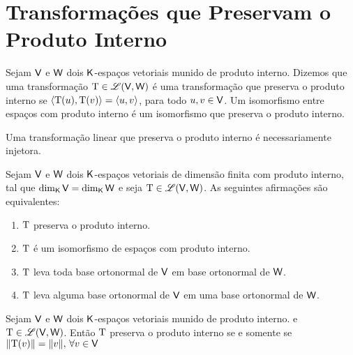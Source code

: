 \documentclass[10pt,a4paper]{book}
\begin{document}
\section{Transformações que Preservam o Produto Interno}

\begin{definition}
	Sejam $\mathsf{ V }$ e $\mathsf{ W }$ dois $\mathsf{ K }$-espaços vetoriais munido de produto interno. Dizemos que uma transformação $\mathrm{ T } \in \mathscr{ L }(\mathsf{ V }, \mathsf{ W })$ é uma transformação que preserva o produto interno se $\langle \mathrm{ T }(u), \mathrm{ T }(v) \rangle = \langle u, v \rangle$, para todo $u, v \in \mathsf{ V }$. Um isomorfismo entre espaços com produto interno é um isomorfismo que preserva o produto interno.
\end{definition}

\begin{remark}
	Uma transformação linear que preserva o produto interno é necessariamente injetora.
\end{remark}

\begin{theorem}
	Sejam $\mathsf{ V }$ e $\mathsf{ W }$ dois $\mathsf{ K }$-espaços vetoriais de dimensão finita com produto interno, tal que $\dim_{\mathsf{ K }} \mathsf{ V } = \dim_{\mathsf{ K }} \mathsf{ W }$ e seja $\mathrm{ T } \in \mathscr{ L }(\mathsf{ V }, \mathsf{ W })$. As seguintes afirmações são equivalentes:
	\begin{enumerate}
		\item $\mathrm{ T }$ preserva o produto interno.
		\item $\mathrm{ T }$ é um isomorfismo de espaços com produto interno.
		\item $\mathrm{ T }$ leva toda base ortonormal de $\mathsf{ V }$ em base ortonormal de $\mathsf{ W }$.
		\item $\mathrm{ T }$ leva alguma base ortonormal de $\mathsf{ V }$ em uma base ortonormal de $\mathsf{ W }$.
	\end{enumerate}
\end{theorem}

\begin{theorem}
	Sejam $\mathsf{ V }$ e $\mathsf{ W }$ dois $\mathsf{ K }$-espaços vetoriais munido de produto interno. e $\mathrm{ T } \in \mathscr{ L }(\mathsf{ V }, \mathsf{ W })$. Então $\mathrm{ T }$ preserva o produto interno se e somente se $\lVert \mathrm{ T }(v) \rVert = \lVert v \rVert, \, \forall v \in \mathsf{ V }$ 
\end{theorem}
\end{document}

